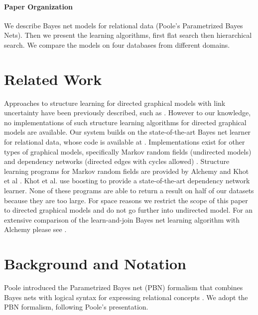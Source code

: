 \documentclass{article}
\begin{document}
\paragraph{Paper Organization} We describe Bayes net models for relational data (Poole's Parametrized Bayes Nets). Then we present the learning algorithms, first flat search then hierarchical search. We compare the models on four databases from different domains.

\section{Related Work} \label{sec:related} Approaches to structure learning for directed graphical models with link uncertainty have been previously described, such as \cite{Getoor2007c}. However
to our knowledge, no implementations of such structure learning algorithms for directed graphical models are available. Our system builds on the state-of-the-art Bayes net learner for relational data, whose code is available at \cite{bib:jbnsite}.
Implementations exist  for other types of graphical models, specifically Markov random fields (undirected models) \cite{Domingos2009} 
and dependency networks (directed edges with cycles allowed) \cite{Natarajan2012}. 
Structure learning programs for Markov random fields are provided by Alchemy \cite{Domingos2009} and Khot et al \cite{Khot2013}. Khot et al. use boosting to provide a state-of-the-art dependency network learner. None of these programs are able to return a result on half of our datasets because they are too large. For space reasons we restrict the scope of this paper to directed graphical models and do not go further into undirected model. For an extensive comparison of the learn-and-join Bayes net learning algorithm with Alchemy please see \cite{Schulte2012}.

\section{Background and Notation} 
Poole introduced the Parametrized Bayes net (PBN) formalism that combines Bayes nets with logical syntax for expressing relational concepts \cite{Poole2003}. We adopt the PBN formalism, following Poole's presentation.
\end{document}
